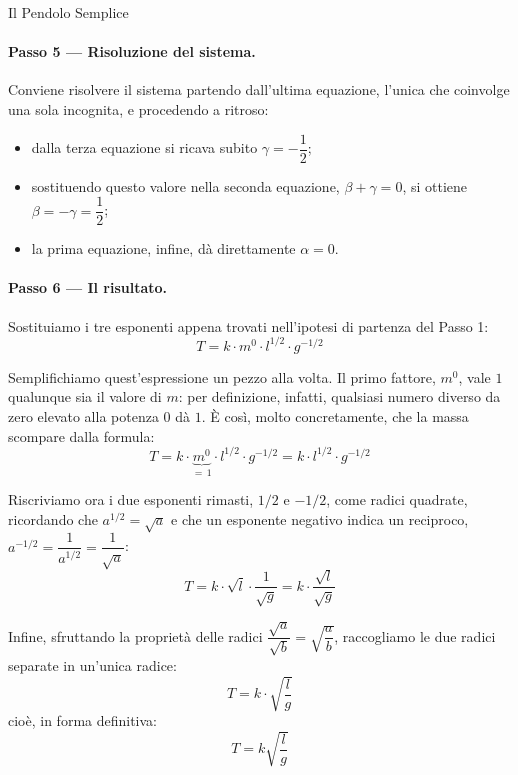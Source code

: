 \begin{esercizio}{Il Pendolo Semplice}
\paragraph{Passo 5 --- Risoluzione del sistema.}
Conviene risolvere il sistema partendo dall'ultima equazione, l'unica che coinvolge una sola incognita, e procedendo a ritroso:
\begin{itemize}
    \item dalla terza equazione si ricava subito $\gamma = -\dfrac{1}{2}$;
    \item sostituendo questo valore nella seconda equazione, $\beta + \gamma = 0$, si ottiene $\beta = -\gamma = \dfrac{1}{2}$;
    \item la prima equazione, infine, dà direttamente $\alpha = 0$.
\end{itemize}

\paragraph{Passo 6 --- Il risultato.}
Sostituiamo i tre esponenti appena trovati nell'ipotesi di partenza del Passo 1:
\begin{equation}
    T = k \cdot m^0 \cdot l^{1/2} \cdot g^{-1/2}
\end{equation}

Semplifichiamo quest'espressione un pezzo alla volta. Il primo fattore, $m^0$, vale $1$ qualunque sia il valore di $m$: per definizione, infatti, qualsiasi numero diverso da zero elevato alla potenza $0$ dà $1$. È così, molto concretamente, che la massa scompare dalla formula:
\begin{equation}
    T = k \cdot \underbrace{m^0}_{=\,1} \cdot l^{1/2} \cdot g^{-1/2} = k \cdot l^{1/2} \cdot g^{-1/2}
\end{equation}

Riscriviamo ora i due esponenti rimasti, $1/2$ e $-1/2$, come radici quadrate, ricordando che $a^{1/2} = \sqrt{a}$ e che un esponente negativo indica un reciproco, $a^{-1/2} = \dfrac{1}{a^{1/2}} = \dfrac{1}{\sqrt{a}}$:
\begin{equation}
    T = k \cdot \sqrt{l} \cdot \frac{1}{\sqrt{g}} = k \cdot \frac{\sqrt{l}}{\sqrt{g}}
\end{equation}

Infine, sfruttando la proprietà delle radici $\dfrac{\sqrt{a}}{\sqrt{b}} = \sqrt{\dfrac{a}{b}}$, raccogliamo le due radici separate in un'unica radice:
\begin{equation}
    T = k \cdot \sqrt{\frac{l}{g}}
\end{equation}
cioè, in forma definitiva:
\begin{equation}
    \boxed{T = k \sqrt{\frac{l}{g}}}
\end{equation}


\end{esercizio}
